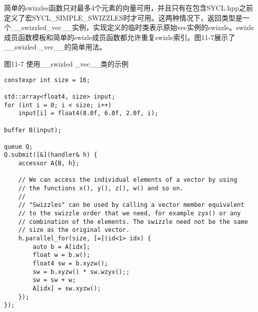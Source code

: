 简单的swizzles函数只对最多4个元素的向量可用，并且只有在包含SYCL.hpp之前定义了宏SYCL\_SIMPLE\_SWIZZLES时才可用。这两种情况下，返回类型是一个\_\_swizzled\_vec\_\_实例，实现定义的临时类表示原始vec实例的swizzle。swizle成员函数模板和简单的swizle成员函数都允许重复swizle索引。图11-7展示了\_\_swizled \_vec\_\_的简单用法。\par

\hspace*{\fill} \par %
图11-7 使用\_\_swizled \_vec\_\_类的示例
\begin{lstlisting}[caption={}]
constexpr int size = 16;

std::array<float4, size> input;
for (int i = 0; i < size; i++)
	input[i] = float4(8.0f, 6.0f, 2.0f, i);

buffer B(input);

queue Q;
Q.submit([&](handler& h) {
	accessor A{B, h};
	
	// We can access the individual elements of a vector by using 
	// the functions x(), y(), z(), w() and so on.
	//
	// "Swizzles" can be used by calling a vector member equivalent
	// to the swizzle order that we need, for example zyx() or any
	// combination of the elements. The swizzle need not be the same
	// size as the original vector.
	h.parallel_for(size, [=](id<1> idx) {
		auto b = A[idx];
		float w = b.w();
		float4 sw = b.xyzw();
		sw = b.xyzw() * sw.wzyx();;
		sw = sw + w;
		A[idx] = sw.xyzw();
	});
});
\end{lstlisting}
































